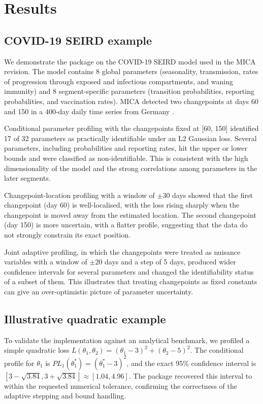 \documentclass[10pt,letterpaper]{article}
\begin{document}
\section*{Results}

\subsection*{COVID-19 SEIRD example}
We demonstrate the package on the COVID-19 SEIRD model used in the MICA revision. The model contains 8 global parameters (seasonality, transmission, rates of progression through exposed and infectious compartments, and waning immunity) and 8 segment-specific parameters (transition probabilities, reporting probabilities, and vaccination rates). MICA detected two changepoints at days 60 and 150 in a 400-day daily time series from Germany \cite{mica}.

Conditional parameter profiling with the changepoints fixed at [60, 150] identified 17 of 32 parameters as practically identifiable under an L2 Gaussian loss. Several parameters, including probabilities and reporting rates, hit the upper or lower bounds and were classified as non-identifiable. This is consistent with the high dimensionality of the model and the strong correlations among parameters in the later segments.

Changepoint-location profiling with a window of $\pm 30$ days showed that the first changepoint (day 60) is well-localised, with the loss rising sharply when the changepoint is moved away from the estimated location. The second changepoint (day 150) is more uncertain, with a flatter profile, suggesting that the data do not strongly constrain its exact position.

Joint adaptive profiling, in which the changepoints were treated as nuisance variables with a window of $\pm 20$ days and a step of 5 days, produced wider confidence intervals for several parameters and changed the identifiability status of a subset of them. This illustrates that treating changepoints as fixed constants can give an over-optimistic picture of parameter uncertainty.

\subsection*{Illustrative quadratic example}
To validate the implementation against an analytical benchmark, we profiled a simple quadratic loss $L(\theta_1, \theta_2) = (\theta_1 - 3)^2 + (\theta_2 - 5)^2$. The conditional profile for $\theta_1$ is $PL_1(\theta_1^*) = (\theta_1^* - 3)^2$, and the exact 95\% confidence interval is $[3 - \sqrt{3.84}, 3 + \sqrt{3.84}] \approx [1.04, 4.96]$. The package recovered this interval to within the requested numerical tolerance, confirming the correctness of the adaptive stepping and bound handling.
\end{document}
